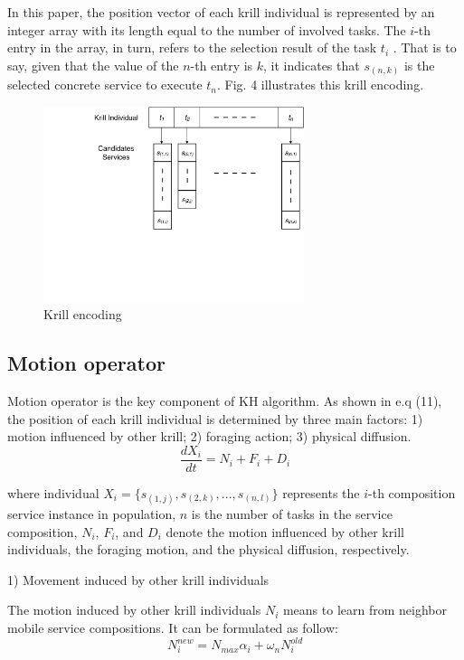 \documentclass[10pt,journal,compsoc]{IEEEtran}
\begin{document}
In this paper, the position vector of each krill individual is represented by an integer array with its length equal to the number of involved tasks. The $i$-th entry in the array, in turn, refers to the selection result of the task $t_i$ . That is to say, given that the value of the $n$-th entry is $k$, it indicates that $s_{(n,k)}$ is the selected concrete service to execute $t_n$. Fig. 4 illustrates this krill encoding.

\begin{figure}[!t]
\centering
\includegraphics[width=3in]{./img/pic4.pdf}
\caption{Krill encoding}
\label{Krill encoding}
\end{figure}


\subsection{Motion operator}
% 
% 

Motion operator is the key component of KH algorithm. As shown in e.q (11), the position of each krill individual is determined by three main factors: 1) motion influenced by other krill; 2) foraging action; 3) physical diffusion. 
\begin{equation}
\frac{dX_i}{dt} =N_i+F_i+D_i
\end{equation}

where individual $X_i = \{s_{(1,j)}, s_{(2,k)}, . . . , s_{(n,l)}\}$ represents the $i$-th composition service instance in population, $n$ is the number of tasks in the service composition, $N_i$, $F_i$, and $D_i$ denote the motion influenced by other krill individuals, the foraging motion, and the physical diffusion, respectively.

1) Movement induced by other krill individuals

The motion induced by other krill individuals $N_i$ means to learn from neighbor mobile service compositions. It can be formulated as follow:
\begin{equation}
N^{new}_i = N_{max}\alpha_i + \omega_n N^{old}_i
\end{equation}
\end{document}
